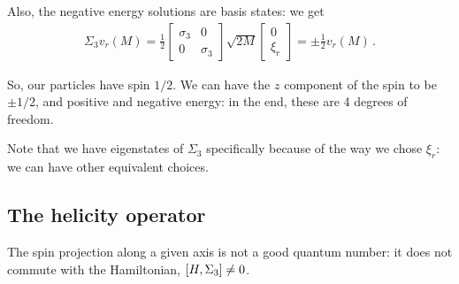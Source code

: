 \documentclass[main.tex]{subfiles}
\begin{document}
Also, the negative energy solutions are basis states: we get 
%
\begin{align}
\Sigma_{3} v_r (M) = \frac{1}{2}
\left[\begin{array}{cc}
\sigma_3  & 0 \\ 
0 & \sigma_3 
\end{array}\right]
\sqrt{2M}
\left[\begin{array}{c}
0   \\
\xi_{r} 
\end{array}\right]
= \pm \frac{1}{2} v_r(M)
\,.
\end{align}

So, our particles have spin \(1/2\). We can have the \(z\) component of the spin to be \(\pm 1 /2 \), and positive and negative energy: in the end, these are 4 degrees of freedom. 

Note that we have eigenstates of \(\Sigma_3 \) specifically because of the way we chose \(\xi_{r}\): we can have other equivalent choices. 

\subsection{The helicity operator}

\begin{claim}
The spin projection along a given axis is not a good quantum number: it does not commute with the Hamiltonian, \(\qty[H , \Sigma_3 ] \neq 0\).
\end{claim}
\end{document}
